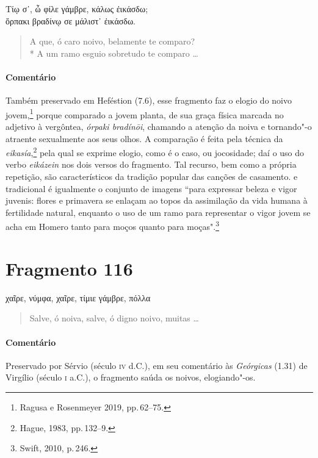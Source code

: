 {\begin{gkverse}
Τίῳ σ᾿, ὦ φίλε γάμβρε, κάλως ἐικάσδω;\\
ὄρπακι βραδίνῳ σε μάλιστ᾿ ἐικάσδω.
\end{gkverse}

\begin{verse}
A que, ó caro noivo, belamente te comparo?\\*
A um ramo esguio sobretudo te comparo \ldots{}
\end{verse}

\medskip

{\paragraph{Comentário} Também preservado em Heféstion (7.6), esse fragmento faz o elogio do noivo jovem,\footnote{Ragusa e Rosenmeyer 2019, pp.\,62--75.} porque comparado a jovem planta, de sua
graça física marcada no adjetivo à vergôntea, \textit{órpaki bradínōi}, chamando a atenção da noiva e tornando"-o atraente sexualmente aos seus olhos.
A comparação é feita pela técnica da \textit{eikasía},\footnote{Hague, 1983, pp.\,132--9.} pela qual se exprime elogio, como é o caso, ou jocosidade; daí o uso do verbo \textit{eikázein} nos dois versos do fragmento. Tal recurso, bem como a própria repetição, são característicos da tradição popular das canções de casamento. e tradicional é igualmente o conjunto de imagens ``para expressar beleza e vigor juvenis: flores e primavera se enlaçam ao topos da assimilação da vida humana à fertilidade natural, enquanto o uso de um ramo para representar o vigor jovem se acha em Homero tanto para moços quanto para moças".\footnote{Swift, 2010, p.\,246.}}

\pagebreak
\section{Fragmento 116}

\begin{gkverse}
χαῖρε, νύμφα, χαῖρε, τίμιε γάμβρε, πόλλα
\end{gkverse}

\begin{verse}
Salve, ó noiva, salve, ó digno noivo, muitas \ldots{}
\end{verse}

\medskip

{\paragraph{Comentário} Preservado por Sérvio (século \textsc{iv} d.C.), em seu comentário às \textit{Geórgicas} (1.31) de Virgílio (século \textsc{i} a.C.), o fragmento saúda os noivos, elogiando"-os.}


}
